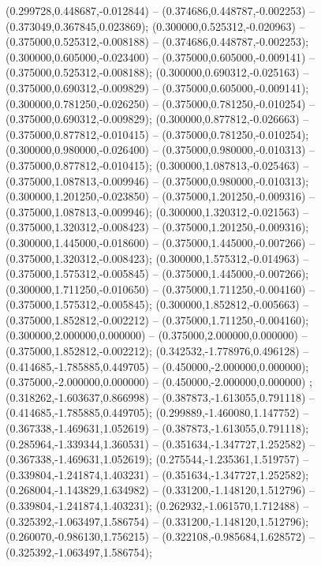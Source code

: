  (0.299728,0.448687,-0.012844) -- (0.374686,0.448787,-0.002253) -- (0.373049,0.367845,0.023869);
 (0.300000,0.525312,-0.020963) -- (0.375000,0.525312,-0.008188) -- (0.374686,0.448787,-0.002253);
 (0.300000,0.605000,-0.023400) -- (0.375000,0.605000,-0.009141) -- (0.375000,0.525312,-0.008188);
 (0.300000,0.690312,-0.025163) -- (0.375000,0.690312,-0.009829) -- (0.375000,0.605000,-0.009141);
 (0.300000,0.781250,-0.026250) -- (0.375000,0.781250,-0.010254) -- (0.375000,0.690312,-0.009829);
 (0.300000,0.877812,-0.026663) -- (0.375000,0.877812,-0.010415) -- (0.375000,0.781250,-0.010254);
 (0.300000,0.980000,-0.026400) -- (0.375000,0.980000,-0.010313) -- (0.375000,0.877812,-0.010415);
 (0.300000,1.087813,-0.025463) -- (0.375000,1.087813,-0.009946) -- (0.375000,0.980000,-0.010313);
 (0.300000,1.201250,-0.023850) -- (0.375000,1.201250,-0.009316) -- (0.375000,1.087813,-0.009946);
 (0.300000,1.320312,-0.021563) -- (0.375000,1.320312,-0.008423) -- (0.375000,1.201250,-0.009316);
 (0.300000,1.445000,-0.018600) -- (0.375000,1.445000,-0.007266) -- (0.375000,1.320312,-0.008423);
 (0.300000,1.575312,-0.014963) -- (0.375000,1.575312,-0.005845) -- (0.375000,1.445000,-0.007266);
 (0.300000,1.711250,-0.010650) -- (0.375000,1.711250,-0.004160) -- (0.375000,1.575312,-0.005845);
 (0.300000,1.852812,-0.005663) -- (0.375000,1.852812,-0.002212) -- (0.375000,1.711250,-0.004160);
 (0.300000,2.000000,0.000000) -- (0.375000,2.000000,0.000000) -- (0.375000,1.852812,-0.002212);
 (0.342532,-1.778976,0.496128) -- (0.414685,-1.785885,0.449705) -- (0.450000,-2.000000,0.000000);
 (0.375000,-2.000000,0.000000) -- (0.450000,-2.000000,0.000000) ;
 (0.318262,-1.603637,0.866998) -- (0.387873,-1.613055,0.791118) -- (0.414685,-1.785885,0.449705);
 (0.299889,-1.460080,1.147752) -- (0.367338,-1.469631,1.052619) -- (0.387873,-1.613055,0.791118);
 (0.285964,-1.339344,1.360531) -- (0.351634,-1.347727,1.252582) -- (0.367338,-1.469631,1.052619);
 (0.275544,-1.235361,1.519757) -- (0.339804,-1.241874,1.403231) -- (0.351634,-1.347727,1.252582);
 (0.268004,-1.143829,1.634982) -- (0.331200,-1.148120,1.512796) -- (0.339804,-1.241874,1.403231);
 (0.262932,-1.061570,1.712488) -- (0.325392,-1.063497,1.586754) -- (0.331200,-1.148120,1.512796);
 (0.260070,-0.986130,1.756215) -- (0.322108,-0.985684,1.628572) -- (0.325392,-1.063497,1.586754);
